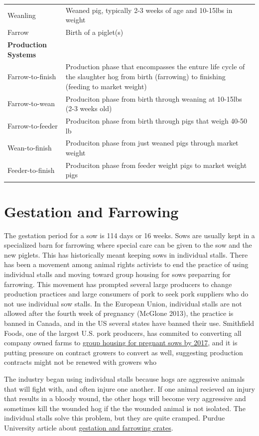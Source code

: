 \documentclass[
  letterpaper,
  DIV=11,
  numbers=noendperiod]{scrreprt}
\begin{document}
\begin{longtable}[]{@{}
  >{\raggedright\arraybackslash}p{}
  >{\raggedright\arraybackslash}p{}@{}}
Weanling & Weaned pig, typically 2-3 weeks of age and 10-15lbs in
weight \\
Farrow & Birth of a piglet(s) \\
\textbf{Production Systems} & \\
Farrow-to-finish & Production phase that encompasses the enture life
cycle of the slaughter hog from birth (farrowing) to finishing (feeding
to market weight) \\
Farrow-to-wean & Produciton phase from birth through weaning at 10-15lbs
(2-3 weeks old) \\
Farrow-to-feeder & Produciton phase from birth through pigs that weigh
40-50 lb \\
Wean-to-finish & Produciton phase from just weaned pigs through market
weight \\
Feeder-to-finish & Produciton phase from feeder weight pigs to market
weight pigs \\
\end{longtable}

\hypertarget{gestation-and-farrowing}{%
\section{Gestation and Farrowing}\label{gestation-and-farrowing}}

The gestation period for a sow is 114 days or 16 weeks. Sows are usually
kept in a specialized barn for farrowing where special care can be given
to the sow and the new piglets. This has historically meant keeping sows
in individual stalls. There has been a movement among animal rights
activists to end the practice of using individual stalls and moving
toward group housing for sows preparring for farrowing. This movement
has prompted several large producers to change production practices and
large consumers of pork to seek pork suppliers who do not use individual
sow stalls. In the European Union, individual stalls are not allowed
after the fourth week of pregnancy (McGlone 2013), the practice is
banned in Canada, and in the US several states have banned their use.
Smithfield Foods, one of the largest U.S. pork producers, has commited
to converting all company owned farms to
\href{pdf-Readings/smithfield-2014report.pdf}{group housing for pregnant
sows by 2017}, and it is putting pressure on contract growers to convert
as well, suggesting production contracts might not be renewed with
growers who

The industry began using individual stalls because hogs are aggressive
animals that will fight with, and often injure one another. If one
animal recieved an injury that results in a bloody wound, the other hogs
will become very aggressive and sometimes kill the wounded hog if the
the wounded animal is not isolated. The individual stalls solve this
problem, but they are quite cramped. Purdue University article about
\href{http://www.ansc.purdue.edu/faen/gest\%20crates.html}{gestation and
farrowing crates}.
\end{document}
